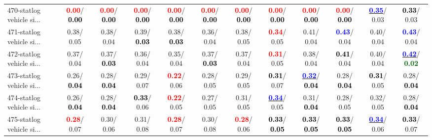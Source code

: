 \begin{table}[h]
\begin{center}
{\begin{tabular}{lc|c|c|c|c|c|c|c|c|c|c}
470-statlog vehicle si... & \textcolor{red}{\textbf{  0.00}}/\textcolor{black}{\textbf{  0.00}} & \textcolor{red}{\textbf{  0.00}}/\textcolor{black}{\textbf{  0.00}} & \textcolor{red}{\textbf{  0.00}}/\textcolor{black}{\textbf{  0.00}} & \textcolor{red}{\textbf{  0.00}}/\textcolor{black}{\textbf{  0.00}} & \textcolor{red}{\textbf{  0.00}}/\textcolor{black}{\textbf{  0.00}} & \textcolor{red}{\textbf{  0.00}}/\textcolor{black}{\textbf{  0.00}} & \textcolor{red}{\textbf{  0.00}}/\textcolor{black}{\textbf{  0.00}} & \textcolor{red}{\textbf{  0.00}}/\textcolor{black}{\textbf{  0.00}} & \textcolor{red}{\textbf{  0.00}}/\textcolor{black}{\textbf{  0.00}} & \underline{\textcolor{blue}{\textbf{  0.35}}}/  0.03 & \textcolor{black}{\textbf{  0.33}}/  0.03 \\
471-statlog vehicle si... &   0.38/  0.05 &   0.38/  0.04 &   0.39/\textcolor{black}{\textbf{  0.03}} &   0.38/\textcolor{black}{\textbf{  0.03}} &   0.36/  0.04 &   0.38/  0.05 & \textcolor{red}{\textbf{  0.34}}/  0.05 &   0.41/  0.04 & \textcolor{blue}{\textbf{  0.43}}/  0.04 &   0.40/  0.04 & \textcolor{blue}{\textbf{  0.43}}/  0.04 \\
472-statlog vehicle si... &   0.37/  0.04 &   0.37/\textcolor{black}{\textbf{  0.03}} &   0.36/  0.04 &   0.35/  0.04 &   0.37/\textcolor{black}{\textbf{  0.03}} &   0.37/  0.04 & \textcolor{red}{\textbf{  0.31}}/  0.05 &   0.38/  0.04 & \textcolor{black}{\textbf{  0.41}}/  0.04 &   0.40/  0.04 & \underline{\textcolor{blue}{\textbf{  0.42}}}/\textcolor{darkgreen}{\textbf{  0.02}} \\
473-statlog vehicle si... &   0.26/\textcolor{black}{\textbf{  0.04}} &   0.28/\textcolor{black}{\textbf{  0.04}} &   0.29/  0.07 & \textcolor{red}{\textbf{  0.22}}/  0.06 &   0.28/  0.05 &   0.29/  0.05 & \textcolor{black}{\textbf{  0.31}}/  0.07 & \underline{\textcolor{blue}{\textbf{  0.32}}}/\textcolor{black}{\textbf{  0.04}} &   0.28/\textcolor{black}{\textbf{  0.04}} & \textcolor{black}{\textbf{  0.31}}/  0.05 &   0.28/\textcolor{black}{\textbf{  0.04}} \\
474-statlog vehicle si... &   0.26/\textcolor{black}{\textbf{  0.04}} &   0.28/\textcolor{black}{\textbf{  0.04}} & \textcolor{black}{\textbf{  0.33}}/  0.06 & \textcolor{red}{\textbf{  0.22}}/  0.05 &   0.27/  0.05 &   0.31/  0.05 & \underline{\textcolor{blue}{\textbf{  0.34}}}/  0.05 &   0.31/\textcolor{black}{\textbf{  0.04}} &   0.28/  0.05 &   0.32/  0.05 &   0.28/\textcolor{black}{\textbf{  0.04}} \\
475-statlog vehicle si... & \textcolor{red}{\textbf{  0.28}}/  0.07 &   0.30/  0.06 &   0.31/  0.08 & \textcolor{red}{\textbf{  0.28}}/  0.07 &   0.30/  0.08 & \textcolor{red}{\textbf{  0.28}}/  0.06 & \textcolor{black}{\textbf{  0.33}}/\textcolor{black}{\textbf{  0.05}} & \textcolor{black}{\textbf{  0.33}}/\textcolor{black}{\textbf{  0.05}} & \textcolor{black}{\textbf{  0.33}}/\textcolor{black}{\textbf{  0.05}} & \underline{\textcolor{blue}{\textbf{  0.34}}}/  0.06 & \textcolor{black}{\textbf{  0.33}}/  0.07 \\

\end{tabular}}
\end{center}
\end{table}
